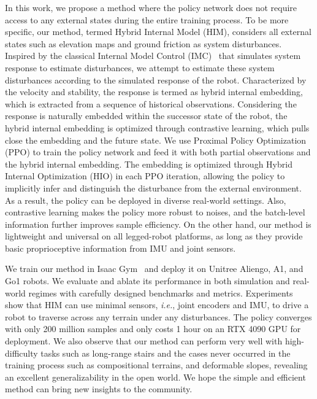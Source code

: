 In this work, we propose a method where the policy network does not require access to any external states during the entire training process. 
To be more specific, our method, termed Hybrid Internal Model (HIM), considers all external states such as elevation maps and ground friction as system disturbances.
Inspired by the classical Internal Model Control (IMC)~\citep{rivera1986internal} that simulates system response to estimate disturbances, we attempt to estimate these system disturbances according to the simulated response of the robot.
Characterized by the velocity and stability, the response is termed as hybrid internal embedding, which is extracted from a sequence of historical observations.
Considering the response is naturally embedded within the successor state of the robot, the hybrid internal embedding is optimized through contrastive learning, which pulls close the embedding and the future state.
We use Proximal Policy Optimization (PPO) to train the policy network and feed it with both partial observations and the hybrid internal embedding.
The embedding is optimized through Hybrid Internal Optimization (HIO) in each PPO iteration, allowing the policy to implicitly infer and distinguish the disturbance from the external environment. 
As a result, the policy can be deployed in diverse real-world settings.
Also, contrastive learning makes the policy more robust to noises, and the batch-level information further improves sample efficiency.
On the other hand, our method is lightweight and universal on all legged-robot platforms, as long as they provide basic proprioceptive information from IMU and joint sensors. 

We train our method in Isaac Gym~\citep{makoviychuk2021isaac} and deploy it on Unitree Aliengo, A1, and Go1 robots. 
We evaluate and ablate its performance in both simulation and real-world regimes with carefully designed benchmarks and metrics.
Experiments show that HIM can use minimal sensors, \emph{i.e.}, joint encoders and IMU, to drive a robot to traverse across any terrain under any disturbances. 
The policy converges with only 200 million samples and only costs 1 hour on an RTX 4090 GPU for deployment.
We also observe that our method can perform very well with high-difficulty tasks such as
long-range stairs and the cases never occurred in the training process such as compositional terrains,
and deformable slopes, revealing an excellent generalizability in the open world.
We hope the simple and efficient method can bring new insights to the community.
